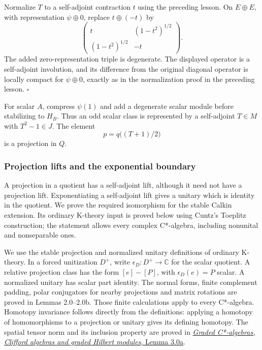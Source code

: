 \documentclass[
  11pt,
]{article}
\begin{document}
Normalize \(T\) to a self-adjoint contraction \(t\) using the preceding
lesson. On \(E\oplus E\), with representation \(\psi\oplus0\), replace
\(t\oplus(-t)\) by \[
\begin{pmatrix}
t&(1-t^2)^{1/2}\\
(1-t^2)^{1/2}&-t
\end{pmatrix}.
\tag{3.2}
\] The added zero-representation triple is degenerate. The displayed
operator is a self-adjoint involution, and its difference from the
original diagonal operator is locally compact for \(\psi\oplus0\),
exactly as in the normalization proof in the preceding lesson.
\(\square\)

For scalar \(A\), compress \(\psi(1)\) and add a degenerate scalar
module before stabilizing to \(H_B\). Thus an odd scalar class is
represented by a self-adjoint \(T\in M\) with \(T^2-1\in J\). The
element \[
p=q\bigl((T+1)/2\bigr)
\tag{3.3}
\] is a projection in \(Q\).

\subsubsection{Projection lifts and the exponential
boundary}\label{projection-lifts-and-the-exponential-boundary}

A projection in a quotient has a self-adjoint lift, although it need not
have a projection lift. Exponentiating a self-adjoint lift gives a
unitary which is identity in the quotient. We prove the required
isomorphism for the stable Calkin extension. Its ordinary K-theory input
is proved below using Cuntz's Toeplitz construction; the statement
allows every complex C*-algebra, including nonunital and nonseparable
ones.

We use the stable projection and normalized unitary definitions of
ordinary K-theory. In a forced unitization \(D^+\), write
\(\epsilon_D:D^+\to\mathbb C\) for the scalar quotient. A relative
projection class has the form \([e]-[P]\), with \(\epsilon_D(e)=P\)
scalar. A normalized unitary has scalar part identity. The normal forms,
finite complement padding, polar conjugators for nearby projections and
matrix rotations are proved in Lemmas 2.0--2.0b. Those finite
calculations apply to every C*-algebra. Homotopy invariance follows
directly from the definitions: applying a homotopy of homomorphisms to a
projection or unitary gives its defining homotopy. The spatial tensor
norm and its inclusion property are proved in
\href{KT-KK-05.html\#lemma-3-0a-the-ordinary-spatial-norm}{\emph{Graded
C*-algebras, Clifford algebras and graded Hilbert modules}, Lemma 3.0a}.
\end{document}
